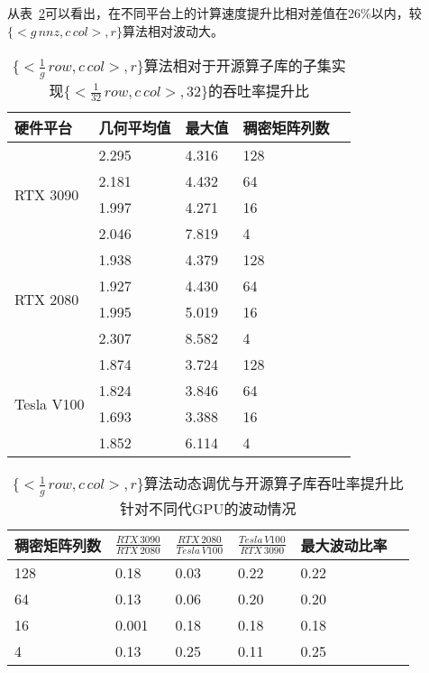 从表~\ref{tab:hw-rb}可以看出，在不同平台上的计算速度提升比相对差值在26\%以内，较$\{<g\,nnz , c\,col>,r\}$算法相对波动大。
\begin{table}
  \centering
  \caption{$\{<\frac{1}{g}\,row , c\,col>,r\}$算法相对于开源算子库的子集实现$\{<\frac{1}{32}\,row , c\,col>,32\}$的吞吐率提升比}
  \begin{tabular}{lllll}
  \toprule
  硬件平台 & 几何平均值  & 最大值 & 稠密矩阵列数 \\
  \midrule
  \multirow{4}{*}{RTX 3090}& 2.295   & 4.316  & 128\\
                          & 2.181   & 4.432  & 64\\
                          & 1.997   & 4.271  & 16\\
                          & 2.046   & 7.819  & 4\\
  \hline
  \multirow{4}{*}{RTX 2080}& 1.938   & 4.379  & 128\\
                          & 1.927   & 4.430  & 64\\
                          & 1.995   & 5.019  & 16\\
                          & 2.307   & 8.582  & 4\\
  \hline
  \multirow{4}{*}{Tesla V100}   & 1.874   & 3.724  & 128\\
                          & 1.824   & 3.846  & 64\\
                          & 1.693   & 3.388  & 16\\
                          & 1.852   & 6.114  & 4\\
  \bottomrule
  \end{tabular}
  \label{tab:over-ori-rb}%
\end{table}
\begin{table}
  \centering
  \caption{$\{<\frac{1}{g}\,row , c\,col>,r\}$算法动态调优与开源算子库吞吐率提升比针对不同代GPU的波动情况}
  \begin{tabular}{llllll}
  \toprule
  稠密矩阵列数 & $\frac{RTX\,3090}{RTX\,2080}$ & $\frac{RTX\,2080}{Tesla\,V100}$  & $\frac{Tesla\,V100}{RTX\,3090}$  & 最大波动比率 \\
  \midrule
  128 & 0.18 & 0.03 & 0.22 & 0.22 \\
  64  & 0.13 & 0.06 & 0.20 & 0.20 \\
  16  & 0.001 & 0.18 & 0.18 & 0.18 \\
  4   & 0.13 & 0.25 & 0.11 & 0.25 \\
  \bottomrule
  \end{tabular}
  \label{tab:hw-rb}
\end{table}


